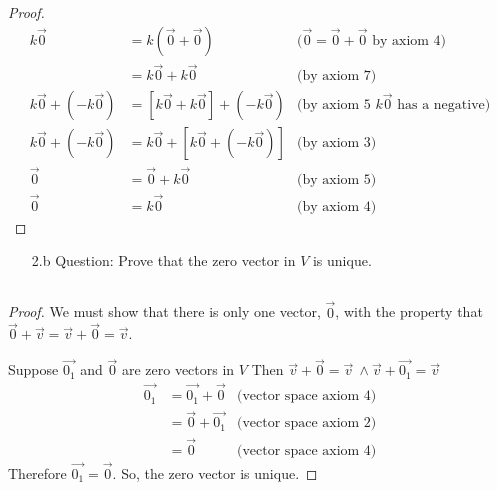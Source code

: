 \documentclass[12pt]{article}
\begin{document}
\subsection[Proof: $k\vec{0} = \vec{0}$]{}
\begin{proof}
        \begin{align*}
                k\vec{0}             & = k(\vec{0} + \vec{0})                & \textrm{($\vec{0} = \vec{0}+\vec{0}$ by axiom 4)} \\
                                     & = k\vec{0} + k\vec{0}                 & \textrm{(by axiom 7)}                             \\
                k\vec{0}+(-k\vec{0}) & = [k\vec{0} + k\vec{0}] + (-k\vec{0}) & \textrm{(by axiom 5 $k\vec{0}$ has a negative)}   \\
                k\vec{0}+(-k\vec{0}) & = k\vec{0} + [k\vec{0} + (-k\vec{0})] & \textrm{(by axiom 3)}                             \\
                \vec{0}              & = \vec{0} + k\vec{0}                  & \textrm{(by axiom 5)}                             \\
                \vec{0}              & = k\vec{0}                            & \textrm{(by axiom 4)}
        \end{align*}
\end{proof}
\begin{enumerate}
        \item[2.b]Question: Prove that the zero vector in $V$ is unique.
\end{enumerate}
\subsection[Proof: the zero vector in $V$ is unique]{}
\begin{proof}
        We must show that there is only one vector, $\vec{0}$, with the property that \\
        $\vec{0} + \vec{v} = \vec{v} + \vec{0} = \vec{v}$.

        Suppose $\vec{0_1}$ and $\vec{0}$ are zero vectors in $V$ Then $\vec{v} + \vec{0} = \vec{v}\ \land \vec{v} + \vec{0_1} = \vec{v}$
        \begin{align*}
                \vec{0_1} & = \vec{0_1} + \vec{0} & \textrm{(vector space axiom 4)} \\
                          & = \vec{0} + \vec{0_1} & \textrm{(vector space axiom 2)} \\
                          & = \vec{0}             & \textrm{(vector space axiom 4)}
        \end{align*}
        Therefore $\vec{0_1} = \vec{0}$. So, the zero vector is unique.
\end{proof}
\pagebreak
\end{document}
